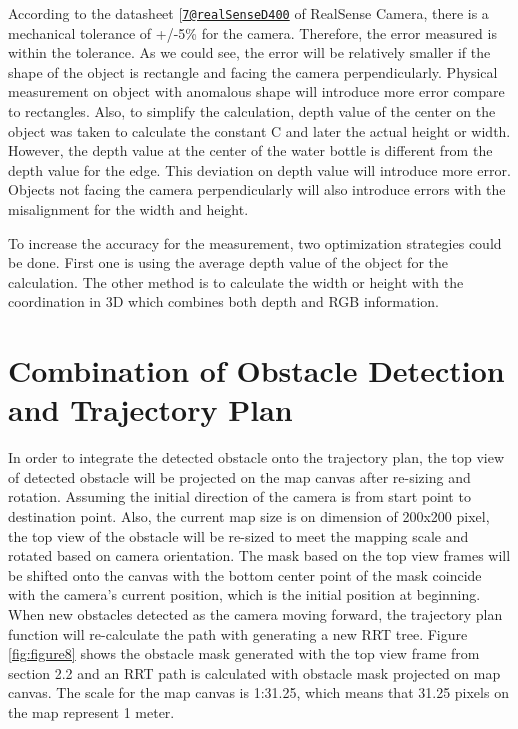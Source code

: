 \documentclass[
  oneside]{ubcthesis}
\begin{document}
According to the datasheet {[}\href{mailto:7@realSenseD400}{\nolinkurl{7@realSenseD400}} of RealSense Camera, there is a mechanical tolerance of +/-5\% for the camera. Therefore, the error measured is within the tolerance. As we could see, the error will be relatively smaller if the shape of the object is rectangle and facing the camera perpendicularly. Physical measurement on object with anomalous shape will introduce more error compare to rectangles. Also, to simplify the calculation, depth value of the center on the object was taken to calculate the constant C and later the actual height or width. However, the depth value at the center of the water bottle is different from the depth value for the edge. This deviation on depth value will introduce more error. Objects not facing the camera perpendicularly will also introduce errors with the misalignment for the width and height.

To increase the accuracy for the measurement, two optimization strategies could be done. First one is using the average depth value of the object for the calculation. The other method is to calculate the width or height with the coordination in 3D which combines both depth and RGB information.

\hypertarget{combination-of-obstacle-detection-and-trajectory-plan}{%
\section{Combination of Obstacle Detection and Trajectory Plan}\label{combination-of-obstacle-detection-and-trajectory-plan}}

In order to integrate the detected obstacle onto the trajectory plan, the top view of detected obstacle will be projected on the map canvas after re-sizing and rotation. Assuming the initial direction of the camera is from start point to destination point. Also, the current map size is on dimension of 200x200 pixel, the top view of the obstacle will be re-sized to meet the mapping scale and rotated based on camera orientation. The mask based on the top view frames will be shifted onto the canvas with the bottom center point of the mask coincide with the camera's current position, which is the initial position at beginning. When new obstacles detected as the camera moving forward, the trajectory plan function will re-calculate the path with generating a new RRT tree. Figure \ref{fig:figure8} shows the obstacle mask generated with the top view frame from section 2.2 and an RRT path is calculated with obstacle mask projected on map canvas. The scale for the map canvas is 1:31.25, which means that 31.25 pixels on the map represent 1 meter.
\end{document}
